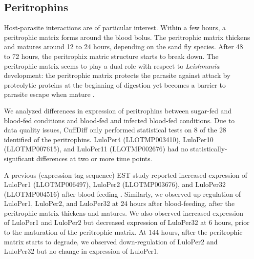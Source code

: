 
\subsection{Peritrophins}
Host-parasite interactions are of particular interest.  Within a few hours, a peritrophic matrix forms around the blood bolus.  The peritrophic matrix thickens and matures around 12 to 24 hours, depending on the sand fly species.  After 48 to 72 hours, the peritrophix matric structure starts to break down.  The peritrophic matrix seems to play a dual role with respect to \emph{Leishmania} development: the peritrophic matrix protects the parasite against attack by proteolytic proteins at the beginning of digestion yet becomes a barrier to parasite escape when mature \cite{Dostalova2012}.

We analyzed differences in expression of peritrophins between sugar-fed and blood-fed conditions and blood-fed and infected blood-fed conditions.  Due to data quality issues, CuffDiff only performed statistical tests on 8 of the 28 identified of the peritrophins.  LuloPer4 (LLOTMP003410), LuloPer10 (LLOTMP007615), and LuloPer11 (LLOTMP002676) had no statistically-significant differences at two or more time points.

A previous (expression tag sequence) EST study reported increased expression of LuloPer1 (LLOTMP006497), LuloPer2 (LLOTMP003676), and LuloPer32 (LLOTMP004516) after blood feeding \cite{Jochim2008}. Similarly, we observed up-regulation of LuloPer1, LuloPer2, and LuloPer32 at 24 hours after blood-feeding, after the peritrophic matrix thickens and matures.  We also observed increased expression of LuloPer1 and LuloPer2 but decreased expression of LuloPer32 at 6 hours, prior to the maturation of the peritrophic matrix. At 144 hours, after the peritrophic matrix starts to degrade, we observed down-regulation of LuloPer2 and LuloPer32 but no change in expression of LuloPer1.

